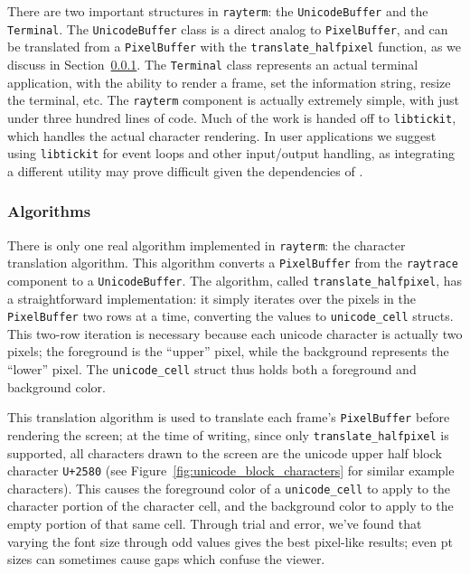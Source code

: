 There are two important structures in \texttt{rayterm}: the \texttt{UnicodeBuffer} and the \texttt{Terminal}.
The \texttt{UnicodeBuffer} class is a direct analog to \texttt{PixelBuffer},
and can be translated from a \texttt{PixelBuffer} with the \texttt{translate\_halfpixel} function, as we discuss in Section~\ref{ch:methods:interface:tickit:algorithms}.
The \texttt{Terminal} class represents an actual terminal application, with the ability to render a frame, set the information string, resize the terminal, etc.
The \texttt{rayterm} component is actually extremely simple, with just under three hundred lines of code.
Much of the work is handed off to \texttt{libtickit}, which handles the actual character rendering.
In user applications we suggest using \texttt{libtickit} for event loops and other input/output handling, as integrating a different utility may prove difficult given the dependencies of \name{}.

\subsubsection{Algorithms}
\label{ch:methods:interface:tickit:algorithms}

There is only one real algorithm implemented in \texttt{rayterm}: the character translation algorithm.
This algorithm converts a \texttt{PixelBuffer} from the \texttt{raytrace} component to a \texttt{UnicodeBuffer}.
The algorithm, called \texttt{translate\_halfpixel}, has a straightforward implementation: it simply iterates over the pixels in the \texttt{PixelBuffer} two rows at a time, converting the values to \texttt{unicode\_cell} structs.
This two-row iteration is necessary because each unicode character is actually two pixels; the foreground is the ``upper'' pixel, while the background represents the ``lower'' pixel.
The \texttt{unicode\_cell} struct thus holds both a foreground and background color.

This translation algorithm is used to translate each frame's \texttt{PixelBuffer} before rendering the screen; at the time of writing, since only \texttt{translate\_halfpixel} is supported, all characters drawn to the screen are the unicode upper half block character \texttt{U+2580} (see Figure~\ref{fig:unicode_block_characters} for similar example characters).
This causes the foreground color of a \texttt{unicode\_cell} to apply to the character portion of the character cell, and the background color to apply to the empty portion of that same cell.
Through trial and error, we've found that varying the font size through odd values gives the best pixel-like results; even pt sizes can sometimes cause gaps which confuse the viewer.

